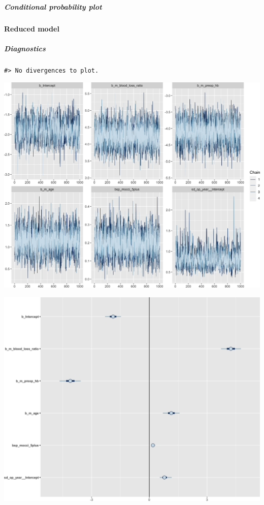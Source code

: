 \documentclass[
]{article}
\begin{document}
\hypertarget{conditional-probability-plot}{%
\subparagraph{Conditional probability plot}\label{conditional-probability-plot}}

\hypertarget{reduced-model}{%
\paragraph{Reduced model}\label{reduced-model}}

\hypertarget{diagnostics-1}{%
\subparagraph{Diagnostics}\label{diagnostics-1}}

\begin{verbatim}
#> No divergences to plot.
\end{verbatim}

\begin{center}\includegraphics[width=1\linewidth]{notebook_files/figure-latex/model1reduced_diagnostics-1} \end{center}

\begin{center}\includegraphics[width=1\linewidth]{notebook_files/figure-latex/model1reduced_diagnostics-2} \end{center}
\end{document}

